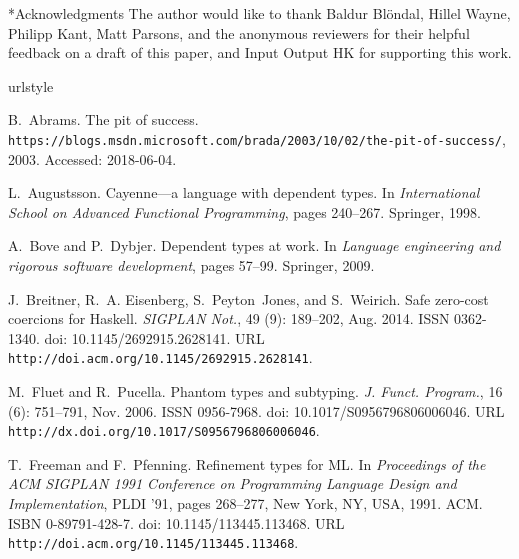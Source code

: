 \documentclass[format=sigplan, review=false, screen=true, 10pt]{acmart}
\makeatletter
\let\origsection\section
\renewcommand\section{\@ifstar{\starsection}{\nostarsection}}
\newcommand\nostarsection[1]
{\sectionprelude\origsection{#1}\sectionpostlude}
\newcommand\starsection[1]
{\sectionprelude\origsection*{#1}\sectionpostlude}
\newcommand\sectionprelude{%
  \vspace{-0.5em}
}
\newcommand\sectionpostlude{%
  \vspace{0em}
}
\makeatother
\begin{document}
\section*{Acknowledgments}
The author would like to thank Baldur Bl\"ondal, Hillel Wayne, Philipp Kant, Matt Parsons,
and the anonymous reviewers for
their helpful feedback on a draft of this paper, and Input Output HK for supporting
this work.

%
%

\begin{thebibliography}{22}
\providecommand{\natexlab}[1]{#1}
\providecommand{\url}[1]{\texttt{#1}}
\expandafter\ifx\csname urlstyle\endcsname\relax
  \providecommand{\doi}[1]{doi: #1}\else
  \providecommand{\doi}{doi: \begingroup \urlstyle{rm}\Url}\fi

B.~Abrams.
\newblock The pit of success.
\newblock
  \url{https://blogs.msdn.microsoft.com/brada/2003/10/02/the-pit-of-success/},
  2003.
\newblock Accessed: 2018-06-04.

L.~Augustsson.
\newblock Cayenne—a language with dependent types.
\newblock In \emph{International School on Advanced Functional Programming},
  pages 240--267. Springer, 1998.

A.~Bove and P.~Dybjer.
\newblock Dependent types at work.
\newblock In \emph{Language engineering and rigorous software development},
  pages 57--99. Springer, 2009.

J.~Breitner, R.~A. Eisenberg, S.~Peyton~Jones, and S.~Weirich.
\newblock Safe zero-cost coercions for {Haskell}.
\newblock \emph{SIGPLAN Not.}, 49 (9): 189--202, Aug. 2014.
\newblock ISSN 0362-1340.
\newblock \doi{10.1145/2692915.2628141}.
\newblock URL \url{http://doi.acm.org/10.1145/2692915.2628141}.

M.~Fluet and R.~Pucella.
\newblock Phantom types and subtyping.
\newblock \emph{J. Funct. Program.}, 16 (6): 751--791, Nov.
  2006.
\newblock ISSN 0956-7968.
\newblock \doi{10.1017/S0956796806006046}.
\newblock URL \url{http://dx.doi.org/10.1017/S0956796806006046}.

T.~Freeman and F.~Pfenning.
\newblock Refinement types for {ML}.
\newblock In \emph{Proceedings of the ACM SIGPLAN 1991 Conference on
  Programming Language Design and Implementation}, PLDI '91, pages 268--277,
  New York, NY, USA, 1991. ACM.
\newblock ISBN 0-89791-428-7.
\newblock \doi{10.1145/113445.113468}.
\newblock URL \url{http://doi.acm.org/10.1145/113445.113468}.


\end{thebibliography}
\end{document}
